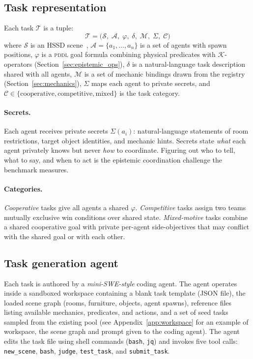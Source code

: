 \documentclass{article} %
\newcommand{\K}{\mathcal{K}}
\newcommand{\agents}{\mathcal{A}}
\newcommand{\mechanics}{\mathcal{M}}
\newcommand{\task}{\mathcal{T}}
\newcommand{\goal}{\varphi}
\newcommand{\taskdesc}{\delta}
\newcommand{\pddl}{\textsc{pddl}}
\begin{document}
\subsection{Task representation}
\label{sec:task_repr}

Each task $\task$ is a tuple:
%
\begin{equation}
  \task = \bigl(\mathcal{S},\; \agents,\; \goal,\; \taskdesc,\; \mechanics,\; \Sigma,\; \mathcal{C} \bigr)
  \label{eq:task_tuple}
\end{equation}
%
where $\mathcal{S}$ is an HSSD scene~\citep{szot2021habitat}, $\agents = \{a_1, \ldots, a_n\}$ is a set of agents with spawn positions, $\goal$ is a \pddl{} goal formula combining physical predicates with $\K$-operators (Section~\ref{sec:epistemic_ops}), $\taskdesc$ is a natural-language task description shared with all agents, $\mechanics$ is a set of mechanic bindings drawn from the registry (Section~\ref{sec:mechanics}), $\Sigma$ maps each agent to private secrets, and $\mathcal{C} \in \{\text{cooperative}, \text{competitive}, \text{mixed}\}$ is the task category.

\paragraph{Secrets.} Each agent receives private secrets $\Sigma(a_i)$: natural-language statements of room restrictions, target object identities, and mechanic hints. Secrets state \emph{what} each agent privately knows but never \emph{how} to coordinate. Figuring out who to tell, what to say, and when to act is the epistemic coordination challenge the benchmark measures.

\paragraph{Categories.} \emph{Cooperative} tasks give all agents a shared $\goal$. \emph{Competitive} tasks assign two teams mutually exclusive win conditions over shared state. \emph{Mixed-motive} tasks combine a shared cooperative goal with private per-agent side-objectives that may conflict with the shared goal or with each other.

\subsection{Task generation agent}
\label{sec:gen_agent}

Each task is authored by a \textit{mini-SWE-style} \citep{minisweagent2025} coding agent. The agent operates inside a sandboxed workspace containing a blank task template (JSON file), the loaded scene graph (rooms, furniture, objects, agent spawns), reference files listing available mechanics, predicates, and actions, and a set of seed tasks sampled from the existing pool (see Appendix~\ref{app:workspace} for an example of workspace, the scene graph and prompt given to the coding agent).
The agent edits the task file using shell commands (\texttt{bash}, \texttt{jq}) and invokes five tool calls: \texttt{new\_scene}, \texttt{bash}, \texttt{judge}, \texttt{test\_task}, and \texttt{submit\_task}.
\end{document}
